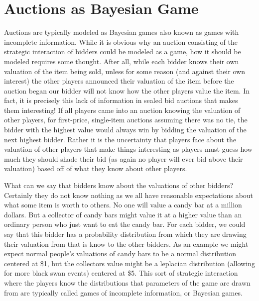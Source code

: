 \documentclass[12pt,twoside]{reedthesis}
\begin{document}
\section{Auctions as Bayesian Game}
Auctions are typically modeled as Bayesian games also known as games with incomplete information. While it is obvious why an auction consisting of the strategic interaction of bidders could be modeled as a game, how it should be modeled requires some thought. After all, while each bidder knows their own valuation of the item being sold, unless for some reason (and against their own interest) the other players announced their valuation of the item before the auction began our bidder will not know how the other players value the item. In fact, it is precisely this lack of information in sealed bid auctions that makes them interesting! If all players came into an auction knowing the valuation of other players, for first-price, single-item auctions assuming there was no tie, the bidder with the highest value would always win by bidding the valuation of the next highest bidder. Rather it is the uncertainty that players face about the valuation of other players that make things interesting as players must guess how much they should shade their bid (as again no player will ever bid above their valuation) based off of what they know about other players. 

What can we say that bidders know about the valuations of other bidders? Certainly they do not know nothing as we all have reasonable expectations about what some item is worth to others. No one will value a candy bar at a million dollars. But a collector of candy bars might value it at a higher value than an ordinary person who just want to eat the candy bar. For each bidder, we could say that this bidder has a probability distribution from which they are drawing their valuation from that is know to the other bidders. As an example we might expect normal people's valuations of candy bars to be a normal distribution centered at \$1, but the collectors value might be a leplacian distribution (allowing for more black swan events) centered at \$5. This sort of strategic interaction where the players know the distributions that parameters of the game are drawn from are typically called games of incomplete information, or Bayesian games.
 
\end{document}
